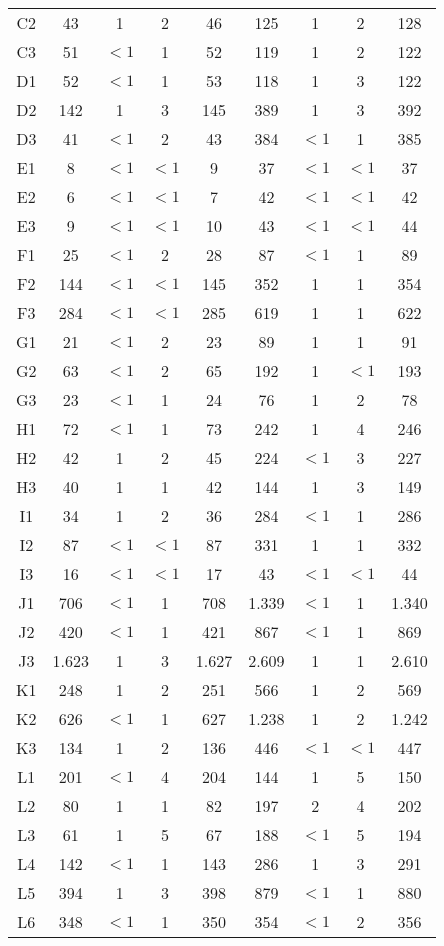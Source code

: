 \begin{center}
\begin{longtable}{ccccc|cccc}
C2&43&1&2&46&125&1&2&128\\
C3&51&$<1$&1&52&119&1&2&122\\
D1&52&$<1$&1&53&118&1&3&122\\
D2&142&1&3&145&389&1&3&392\\
D3&41&$<1$&2&43&384&$<1$&1&385\\
E1&8&$<1$&$<1$&9&37&$<1$&$<1$&37\\
E2&6&$<1$&$<1$&7&42&$<1$&$<1$&42\\
E3&9&$<1$&$<1$&10&43&$<1$&$<1$&44\\
F1&25&$<1$&2&28&87&$<1$&1&89\\
F2&144&$<1$&$<1$&145&352&1&1&354\\
F3&284&$<1$&$<1$&285&619&1&1&622\\
G1&21&$<1$&2&23&89&1&1&91\\
G2&63&$<1$&2&65&192&1&$<1$&193\\
G3&23&$<1$&1&24&76&1&2&78\\
H1&72&$<1$&1&73&242&1&4&246\\
H2&42&1&2&45&224&$<1$&3&227\\
H3&40&1&1&42&144&1&3&149\\
I1&34&1&2&36&284&$<1$&1&286\\
I2&87&$<1$&$<1$&87&331&1&1&332\\
I3&16&$<1$&$<1$&17&43&$<1$&$<1$&44\\
J1&706&$<1$&1&708&1.339&$<1$&1&1.340\\
J2&420&$<1$&1&421&867&$<1$&1&869\\
J3&1.623&1&3&1.627&2.609&1&1&2.610\\
K1&248&1&2&251&566&1&2&569\\
K2&626&$<1$&1&627&1.238&1&2&1.242\\
K3&134&1&2&136&446&$<1$&$<1$&447\\
L1&201&$<1$&4&204&144&1&5&150\\
L2&80&1&1&82&197&2&4&202\\
L3&61&1&5&67&188&$<1$&5&194\\
L4&142&$<1$&1&143&286&1&3&291\\
L5&394&1&3&398&879&$<1$&1&880\\
L6&348&$<1$&1&350&354&$<1$&2&356\\
\end{longtable}
\end{center}

